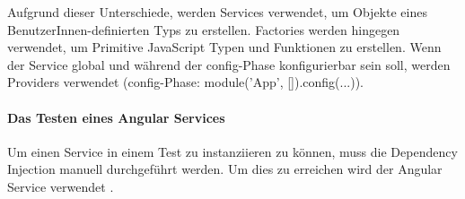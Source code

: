 Aufgrund dieser Unterschiede, werden Services verwendet, um Objekte eines BenutzerInnen-definierten Typs zu erstellen. Factories werden hingegen verwendet, um Primitive JavaScript Typen und Funktionen zu erstellen. Wenn der Service global und während der config-Phase konfigurierbar sein soll, werden Providers verwendet (config-Phase: module('App', []).config(...)).

\paragraph{Das Testen eines Angular Services}
Um einen Service in einem Test zu instanziieren zu können, muss die Dependency Injection manuell durchgeführt werden. Um dies zu erreichen wird der Angular Service  verwendet \autocite{Angular:Injector}.

\newpage
